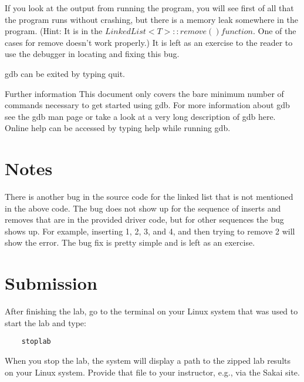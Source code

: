 If you look at the output from running the program, you will see first of all that the program runs without crashing, but there is a memory leak somewhere in the program. (Hint: It is in the $LinkedList<T>::remove() function$. One of the cases for remove doesn't work properly.) It is left as an exercise to the reader to use the debugger in locating and fixing this bug.

gdb can be exited by typing quit.

Further information
This document only covers the bare minimum number of commands necessary to get started using gdb. For more information about gdb see the gdb man page or take a look at a very long description of gdb here. Online help can be accessed by typing help while running gdb. 

\section{Notes}
There is another bug in the source code for the linked list that is not mentioned in the above code. The bug does not show up for the sequence of inserts and removes that are in the provided driver code, but for other sequences the bug shows up. For example, inserting 1, 2, 3, and 4, and then trying to remove 2 will show the error. The bug fix is pretty simple and is left as an exercise.

\section{Submission}
After finishing the lab, go to the terminal on your Linux system that was used to start the lab and type:
\begin{verbatim}
    stoplab 
\end{verbatim}
When you stop the lab, the system will display a path to the zipped lab results on your Linux system.  Provide that file to 
your instructor, e.g., via the Sakai site.

